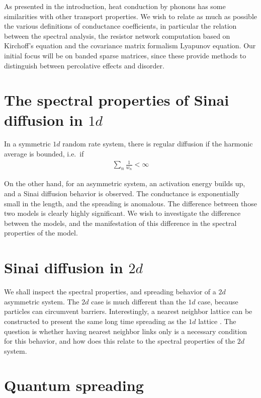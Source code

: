 As presented in the introduction, heat conduction by phonons has some
similarities with other transport properties. We wish to relate as much
as possible the various definitions of conductance coefficients, in 
particular the relation between the spectral analysis,
the resistor network computation based on Kirchoff's equation
and the covariance matrix formalism Lyapunov equation. Our initial focus
will be on banded sparse matrices, since these provide methods to distinguish
between percolative effects and disorder.


\section{The spectral properties of Sinai diffusion in $1d$}

In a symmetric $1d$ random rate system, there is regular diffusion 
if the harmonic average is bounded, i.e.\ if
%
\begin{align}
 \sum_n \frac{1}{w_n} < \infty 
\end{align}
%

On the other hand, for an asymmetric system, an activation energy 
builds up, and a Sinai diffusion behavior is observed.
The conductance is exponentially small in the length, and the spreading 
is anomalous. The difference between those two models is clearly highly 
significant. We wish to investigate the difference between the models,
and the manifestation of this difference in the spectral properties of the model.

\section{Sinai diffusion in $2d$}

We shall inspect the spectral properties, and spreading behavior of a
$2d$ asymmetric system. The $2d$ case is much different than the $1d$ 
case, because particles can circumvent barriers. Interestingly,
a nearest neighbor lattice can be constructed to present the same 
long time spreading as the $1d$ lattice \cite{blumberg_selinger_diffusion_1989}.
The question is whether having nearest neighbor links only 
is a necessary condition for this behavior,
and how does this relate to the spectral properties of the $2d$ system.



\section{Quantum spreading}

